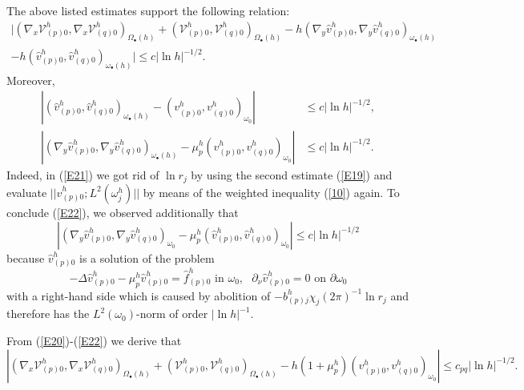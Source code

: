 \documentclass[11pt]{article}%
\numberwithin{equation}{section}
\begin{document}
The above listed estimates support the following relation:%
\begin{gather}
|(\nabla_{x}\mathcal{V}_{(p)0}^{h},\nabla_{x}\mathcal{V}_{(q)0}^{h}%
)_{\Omega_{\bullet}(h)}+(\mathcal{V}_{(p)0}^{h},\mathcal{V}_{(q)0}%
^{h})_{\Omega_{\bullet}(h)}-h(\nabla_{y}\widehat{v}_{(p)0}^{h},\nabla
_{y}\widehat{v}_{(q)0}^{h})_{\omega_{\bullet}(h)}\label{E20}\\
-h(\widehat{v}_{(p)0}^{h},\widehat{v}_{(q)0}^{h})_{\omega_{\bullet}(h)}|\leq
c|\ln h|^{-1/2}.\nonumber
\end{gather}
Moreover,%
\begin{align}
|(\widehat{v}_{(p)0}^{h},\widehat{v}_{(q)0}^{h})_{\omega_{\bullet}%
(h)}-(v_{(p)0}^{h},v_{(q)0}^{h})_{\omega_{0}}|  &  \leq c|\ln h|^{-1/2}%
,\label{E21}\\
|(\nabla_{y}\widehat{v}_{(p)0}^{h},\nabla_{y}\widehat{v}_{(q)0}^{h}%
)_{\omega_{\bullet}(h)}-\mu_{p}^{h}(v_{(p)0}^{h},v_{(q)0}^{h})_{\omega_{0}}|
&  \leq c|\ln h|^{-1/2}. \label{E22}%
\end{align}
Indeed, in (\ref{E21}) we got rid of $\ln r_{j}$ by using the second estimate
(\ref{E19}) and evaluate $||\widehat{v}_{(p)0}^{h};L^{2}(\omega_{j}^{h})||$ by
means of the weighted inequality (\ref{10}) again. To conclude (\ref{E22}), we
observed additionally that%
\[
|(\nabla_{y}\widehat{v}_{(p)0}^{h},\nabla_{y}\widehat{v}_{(q)0}^{h}%
)_{\omega_{0}}-\mu_{p}^{h}(\widehat{v}_{(p)0}^{h},\widehat{v}_{(q)0}%
^{h})_{\omega_{0}}|\leq c|\ln h|^{-1/2}%
\]
because $\widehat{v}_{(p)0}^{h}$ is a solution of the problem%
\[
-\Delta\widehat{v}_{(p)0}^{h}-\mu_{p}^{h}\widehat{v}_{(p)0}^{h}=\widehat
{f}_{(p)0}^{h}\text{ in }\omega_{0},\ \ \ \partial_{\nu}\widehat{v}_{(p)0}%
^{h}=0\text{ on }\partial\omega_{0}%
\]
with a right-hand side which is caused by abolition of $-b_{(p)j}^{h}\chi
_{j}(2\pi)^{-1}\ln r_{j}$ and therefore has the $L^{2}(\omega_{0})$-norm of
order $|\ln h|^{-1}$.

From (\ref{E20})-(\ref{E22}) we derive that%
\begin{equation}
|(\nabla_{x}\mathcal{V}_{(p)0}^{h},\nabla_{x}\mathcal{V}_{(q)0}^{h}%
)_{\Omega_{\bullet}(h)}+(\mathcal{V}_{(p)0}^{h},\mathcal{V}_{(q)0}%
^{h})_{\Omega_{\bullet}(h)}-h(1+\mu_{p}^{h})(v_{(p)0}^{h},v_{(q)0}%
^{h})_{\omega_{0}}|\leq c_{pq}|\ln h|^{-1/2}. \label{E23}%
\end{equation}
\end{document}
